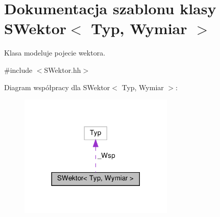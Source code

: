 \hypertarget{classSWektor}{}\section{Dokumentacja szablonu klasy S\+Wektor$<$ Typ, Wymiar $>$}
\label{classSWektor}


Klasa modeluje pojecie wektora.  




{\ttfamily \#include $<$S\+Wektor.\+hh$>$}



Diagram współpracy dla S\+Wektor$<$ Typ, Wymiar $>$\+:\nopagebreak
\begin{figure}[H]
\begin{center}
\leavevmode
\includegraphics[width=209pt]{classSWektor__coll__graph}
\end{center}
\end{figure}
